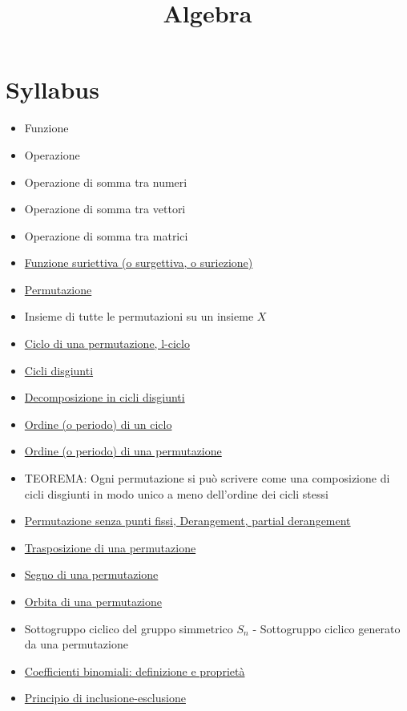 \documentclass[a4paper,10pt]{article}
\title{Algebra}
\author{}
\begin{document}
\maketitle

\section*{Syllabus}
\begin{itemize}
 \item Funzione
 \item Operazione
 \item Operazione di somma tra numeri
 \item Operazione di somma tra vettori
 \item Operazione di somma tra matrici
 \item \href{./FunzioneSuriettiva.html}{Funzione suriettiva (o surgettiva, o suriezione)} 
 \item \href{./Permutazione.html}{Permutazione}
 \item Insieme di tutte le permutazioni su un insieme $X$
 \item \href{./PermutazioneCicli.html}{Ciclo di una permutazione, l-ciclo}
 \item \href{./PermutazioniDisgiunte.html}{Cicli disgiunti}
 \item \href{./PermutazioneDecomposizioneCicli.html}{Decomposizione in cicli disgiunti}
 \item \href{./PermutazioneCicliPeriodo.html}{Ordine (o periodo) di un ciclo}
 \item \href{./PermutazionePeriodo.html}{Ordine (o periodo) di una permutazione}
 \item TEOREMA: Ogni permutazione si può scrivere come una composizione di cicli disgiunti in modo unico a meno dell'ordine dei cicli stessi
 \item \href{./Derangement.html}{Permutazione senza punti fissi, Derangement, partial derangement}
 \item \href{./PermutazioneTrasposizione.html}{Trasposizione di una permutazione}
 \item \href{./PermutazioneSegno.html}{Segno di una permutazione}
 \item \href{./PermutazioneOrbita.html}{Orbita di una permutazione}
 \item Sottogruppo ciclico del gruppo simmetrico $S_n$ - Sottogruppo ciclico generato da una permutazione
 \item \href{./CoefficientiBinomiali.html}{Coefficienti binomiali: definizione e proprietà}
 \item \href{./PrincipioInclusioneEsclusione.html}{Principio di inclusione-esclusione}
 

\end{itemize}
\end{document}
